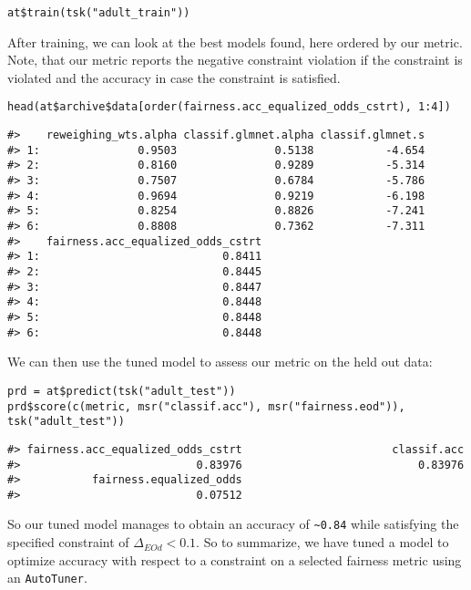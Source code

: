 \begin{verbatim}
at$train(tsk("adult_train"))
\end{verbatim}

After training, we can look at the best models found, here ordered by our metric.
Note, that our metric reports the negative constraint violation if the constraint is violated and the accuracy in case the constraint is satisfied.

\begin{verbatim}
head(at$archive$data[order(fairness.acc_equalized_odds_cstrt), 1:4])
\end{verbatim}

\begin{verbatim}
#>    reweighing_wts.alpha classif.glmnet.alpha classif.glmnet.s
#> 1:               0.9503               0.5138           -4.654
#> 2:               0.8160               0.9289           -5.314
#> 3:               0.7507               0.6784           -5.786
#> 4:               0.9694               0.9219           -6.198
#> 5:               0.8254               0.8826           -7.241
#> 6:               0.8808               0.7362           -7.311
#>    fairness.acc_equalized_odds_cstrt
#> 1:                            0.8411
#> 2:                            0.8445
#> 3:                            0.8447
#> 4:                            0.8448
#> 5:                            0.8448
#> 6:                            0.8448
\end{verbatim}

We can then use the tuned model to assess our metric on the held out data:

\begin{verbatim}
prd = at$predict(tsk("adult_test"))
prd$score(c(metric, msr("classif.acc"), msr("fairness.eod")),  tsk("adult_test"))
\end{verbatim}

\begin{verbatim}
#> fairness.acc_equalized_odds_cstrt                       classif.acc 
#>                           0.83976                           0.83976 
#>           fairness.equalized_odds 
#>                           0.07512
\end{verbatim}

So our tuned model manages to obtain an accuracy of \texttt{\textasciitilde{}0.84} while satisfying the specified constraint of \(\Delta_{EOd} < 0.1\).
So to summarize, we have tuned a model to optimize accuracy with respect to a constraint on a selected fairness metric using an \texttt{AutoTuner}.

